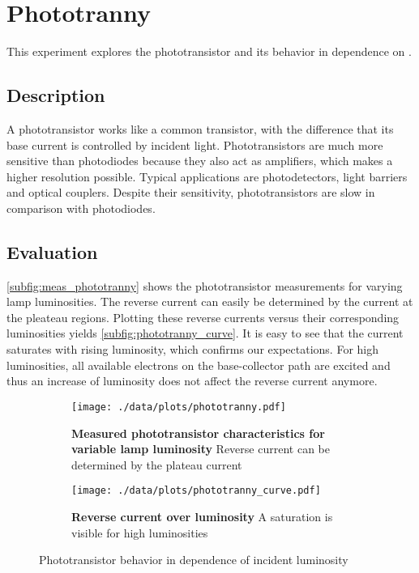 \chapter{Phototranny}
This experiment explores the phototransistor and its behavior in dependence on .

\section{Description}
A phototransistor works like a common transistor, with the difference that its base current is controlled by incident light.
Phototransistors are much more sensitive than photodiodes because they also act as amplifiers, which makes a higher resolution possible.
Typical applications are photodetectors, light barriers and optical couplers.
Despite their sensitivity, phototransistors are slow in comparison with photodiodes.

\section{Evaluation}
\autoref{subfig:meas_phototranny} shows the phototransistor measurements for varying lamp luminosities.
The reverse current can easily be determined by the current at the pleateau regions.
Plotting these reverse currents versus their corresponding luminosities yields \autoref{subfig:phototranny_curve}.
It is easy to see that the current saturates with rising luminosity, which confirms our expectations.
For high luminosities, all available electrons on the base-collector path are excited and thus an increase of luminosity does not affect the reverse current anymore.
\begin{figure}[btp]
	\centering
	\begin{subfigure}{0.4\textwidth}
		\centering
		\texttt{[image: ./data/plots/phototranny.pdf]}
		\caption[Measured phototransistor characteristics for variable lamp luminosity]{\textbf{Measured phototransistor characteristics for variable lamp luminosity} Reverse current can be determined by the plateau current}
		\label{subfig:meas_phototranny}
	\end{subfigure}\quad
	\begin{subfigure}{0.4\textwidth}
		\centering
		\texttt{[image: ./data/plots/phototranny\_curve.pdf]}
		\caption[Reverse current over luminosity]{\textbf{Reverse current over luminosity} A saturation is visible for high luminosities}
		\label{subfig:phototranny_curve}
	\end{subfigure}
	\caption{Phototransistor behavior in dependence of incident luminosity}
\end{figure}
